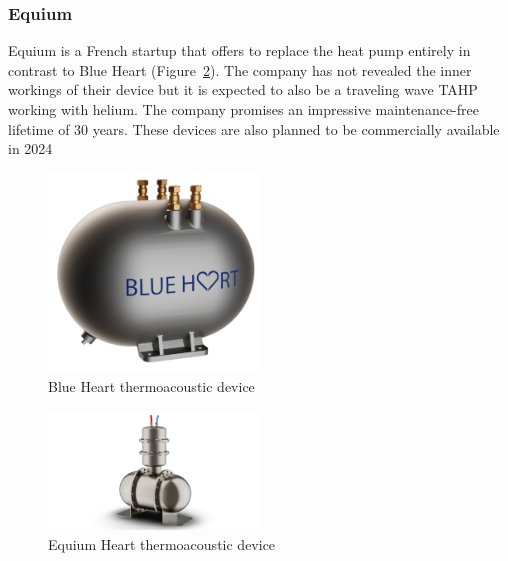 \documentclass[a4paper]{article}
\begin{document}
\subsubsection{Equium\cite{equium}}
Equium is a French startup that offers to replace the heat pump entirely in contrast to Blue Heart (Figure~\ref{equium}). The company has not revealed the inner workings of their device but it is expected to also be a traveling wave TAHP working with helium. The company promises an impressive maintenance-free lifetime of 30 years. These devices are also planned to be commercially available in 2024
\begin{figure}[h]
  \centering
  \includegraphics[width=0.5\textwidth]{images/blueheart.png}
  \caption{Blue Heart thermoacoustic device\cite{blueheart}}\label{blueheart}
\end{figure}
\begin{figure}[h]
  \centering
  \includegraphics[width=0.5\textwidth]{images/equium.jpg}
  \caption{Equium Heart thermoacoustic device\cite{equium}}\label{equium}
\end{figure}
\end{document}
